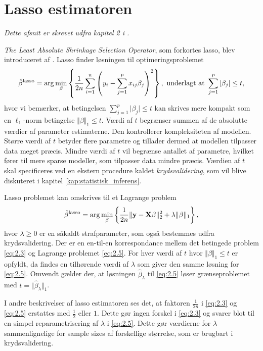 \section{Lasso estimatoren} \label{sec:lasso_estimatoren}
\textit{Dette afsnit er skrevet udfra kapitel 2 i \citep{hastie}.}

\textit{The Least Absolute Shrinkage Selection Operator}, som forkortes lasso, blev introduceret af \citep{lasso}. 
Lasso finder løsningen til optimeringsproblemet
\begin{align}
\hat{\beta}^\text{lasso} = \arg \min_{\beta} \cbr{\frac{1}{2n} \sum_{i=1}^n \del{y_i - \sum_{j=1}^p x_{ij} \beta_j}^2}, \ \text{underlagt at } \sum_{j=1}^p \vert \beta_j \vert \leq t, \label{eq:2.3}
\end{align} 
hvor vi bemærker, at betingelsen $\sum_{j=1}^p \vert \beta_j \vert \leq t$ kan skrives mere kompakt som en \(\ell_1\)-norm betingelse $\Vert \beta \Vert_1 \leq t$.
Værdi af \(t\) begrænser summen af de absolutte værdier af parameter estimaterne.
Den kontrollerer kompleksiteten af modellen. 
Større værdi af \(t\) betyder flere parametre og tillader dermed at modellen tilpasser data meget præcis.
Mindre værdi af \(t\) vil begrænse antallet af parametre, hvilket fører til mere sparse modeller, som tilpasser data mindre præcis.
Værdien af \(t\) skal specificeres ved en ekstern procedure kaldet \textit{krydsvalidering}, som vil blive diskuteret i kapitel \ref{kap:statistisk_inferens}.

Lasso problemet kan omskrives til et Lagrange problem
\begin{align}
\hat{\beta}^\text{lasso} = \arg \min_{\beta} \cbr{\frac{1}{2n} \Vert \y - \X \beta \Vert_2^2 + \lambda \Vert \beta \Vert_1}, \label{eq:2.5}
\end{align}
hvor $\lambda \geq 0$ er en såkaldt strafparameter, som også bestemmes udfra krydsvalidering. 
Der er en en-til-en korrespondance mellem det betingede problem \eqref{eq:2.3} og Lagrange problemet \eqref{eq:2.5}. 
For hver værdi af \(t\) hvor \(\Vert \beta \Vert_1 \leq t\) er opfyldt, da findes en tilhørende værdi af $\lambda$ som giver den samme løsning for \eqref{eq:2.5}.
Omvendt gælder der, at løsningen $\hat{\beta}_\lambda$ til \eqref{eq:2.5} løser grænseproblemet med $t=\Vert \hat{\beta}_\lambda \Vert_1$.

I andre beskrivelser af lasso estimatoren ses det, at faktoren \(\frac{1}{2n}\) i \eqref{eq:2.3} og \eqref{eq:2.5} erstattes med \(\frac{1}{2}\) eller \(1\).
Dette gør ingen forskel i \eqref{eq:2.3} og svarer blot til en simpel reparametrisering af \(\lambda\) i \eqref{eq:2.5}.
Dette gør værdierne for \(\lambda\) sammenlignelige for sample sizes af forskellige størrelse, som er brugbart i krydsvalidering.

